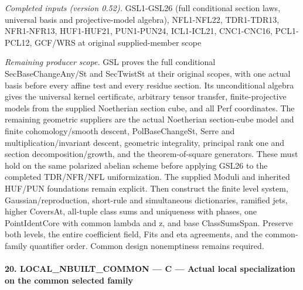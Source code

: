 \documentclass[11pt,a4paper]{article}
\numberwithin{equation}{section}
\theoremstyle{remark}\newtheorem{remark}[theorem]{Remark}
\begin{document}
\emph{Completed inputs (version 0.52).} GSL1-GSL26 (full conditional section laws, universal basis and projective-model algebra), NFL1-NFL22, TDR1-TDR13, NFR1-NFR13, HUF1-HUF21, PUN1-PUN24, ICL1-ICL21, CNC1-CNC16, PCL1-PCL12, GCF/WRS at original supplied-member scope

\emph{Remaining producer scope.} GSL proves the full conditional SecBaseChangeAny/St and SecTwistSt at their original scopes, with one actual basis before every affine test and every residue section. Its unconditional algebra gives the universal kernel certificate, arbitrary tensor transfer, finite-projective models from the supplied Noetherian section cube, and all Perf coordinates. The remaining geometric suppliers are the actual Noetherian section-cube model and finite cohomology/smooth descent, PolBaseChangeSt, Serre and multiplication/invariant descent, geometric integrality, principal rank one and section decomposition/growth, and the theorem-of-square generators. These must hold on the same polarized abelian scheme before applying GSL26 to the completed TDR/NFR/NFL uniformization. The supplied Moduli and inherited HUF/PUN foundations remain explicit. Then construct the finite level system, Gaussian/reproduction, short-rule and simultaneous dictionaries, ramified jets, higher CoversAt, all-tuple class sums and uniqueness with phases, one PointIdentCore with common lambda and z, and base ClassSumsSpan. Preserve both levels, the entire coefficient field, Fits and eta agreements, and the common-family quantifier order. Common design nonemptiness remains required.



\paragraph{20. LOCAL\_\allowbreak NBUILT\_\allowbreak COMMON — C — Actual local specialization on the common selected family}
\end{document}
